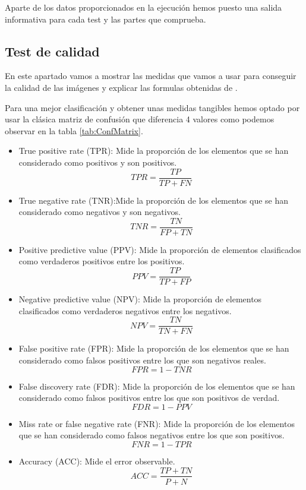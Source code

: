 Aparte de los datos proporcionados en la ejecución hemos puesto una salida informativa para cada test y las partes que comprueba.
 
\subsection{Test de calidad}
En este apartado vamos a mostrar las medidas que vamos a usar para conseguir la calidad de las imágenes y explicar las formulas obtenidas de \cite{wiki:confMatrix}.

Para una mejor clasificación y obtener unas medidas tangibles hemos optado por usar la clásica matriz de confusión que diferencia 4 valores como podemos observar en la tabla \ref{tab:ConfMatrix}.

\begin{itemize}
\item True positive rate (TPR): Mide la proporción de los elementos que se han considerado como positivos y son positivos.
\[TPR=\frac{TP}{TP+FN}\]

\item True negative rate (TNR):Mide la proporción de los elementos que se han considerado como negativos y son negativos. 
\[TNR=\frac{TN}{FP+TN}\]

\item Positive predictive value (PPV): Mide la proporción de elementos clasificados como verdaderos positivos entre los positivos.
\[PPV=\frac{TP}{TP+FP}\]


\item Negative predictive value (NPV): Mide la proporción de elementos clasificados como verdaderos negativos entre los negativos.  
\[NPV=\frac{TN}{TN+FN}\]


\item False positive rate (FPR):
Mide la proporción de los elementos que se han considerado como falsos positivos entre los que son negativos reales.
 \[FPR=1-TNR\]

\item False discovery rate (FDR):
Mide la proporción de los elementos que se han considerado como falsos positivos entre los que son positivos de verdad.
\[FDR=1-PPV\]

\item Miss rate or false negative rate (FNR):
Mide la proporción de los elementos que se han considerado como falsos negativos entre los que son  positivos. \[FNR=1-TPR\]

\item Accuracy (ACC): Mide el error observable.
\[ACC=\frac{TP+TN}{P+N}\]


\end{itemize}
